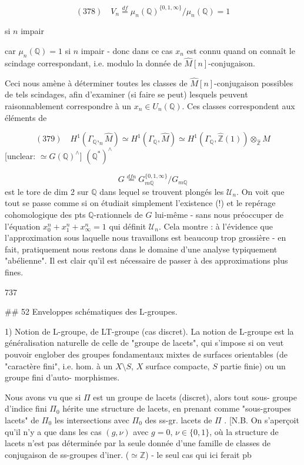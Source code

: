 $$ (378) \quad V_n \overset{df}{=} \mu_n(\mathbb{Q})^{\{0,1,\infty\}} / \mu_n(\mathbb{Q}) = 1 $$

si $n$ impair

car $\mu_n(\mathbb{Q}) = 1$ si $n$ impair - donc dans
ce cas $x_n$ est connu quand on connaît
le scindage correspondant, i.e. modulo la
donnée de $\hat{M}[n]$-conjugaison.

Ceci nous amène à déterminer toutes les
classes de $\hat{M}[n]$-conjugaison possibles de
tels scindages, afin d'examiner (si faire se
peut) lesquels peuvent raisonnablement
correspondre à un $x_n \in U_n(\mathbb{Q})$. Ces classes
correspondent aux éléments de

$$ (379) \quad H^1(\Gamma_{\mathbb{Q}}, _n\hat{M}) \simeq H^1(\Gamma_{\mathbb{Q}}, \hat{M}) \simeq H^1(\Gamma_{\mathbb{Q}}, \hat{\mathbb{Z}}(1)) \otimes_{\hat{\mathbb{Z}}} M $$
[unclear: $\simeq G(\mathbb{Q})^\wedge$] \qquad $(\mathbb{Q}^*)^{\wedge}$

\newpage


$$G \overset{dfn}{=} G_{m\mathbb{Q}}^{\{0,1,\infty\}} / G_{m\mathbb{Q}}$$
est le tore de dim 2 sur $\mathbb{Q}$ dans lequel
se trouvent plongés les $\mathcal{U}_n$. On voit que
tout se passe comme si on étudiait
simplement l'existence (!) et le repérage
cohomologique des pts $\mathbb{Q}$-rationnels de
$G$ lui-même - sans nous préoccuper
de l'équation $x_0^n + x_1^n + x_\infty^n = 1$ qui définit
$\mathcal{U}_n$. Cela montre : à l'évidence que
l'approximation sous laquelle nous travaillons
est beaucoup trop grossière - en fait,
pratiquement nous restons dans le
domaine d'une analyse typiquement
"abélienne". Il est clair qu'il est
nécessaire de passer à des approximations
plus fines.

\newpage


737

## 52 Enveloppes schématiques des L-groupes.

1) Notion de L-groupe, de LT-groupe (cas discret).
La notion de L-groupe est la généralisation
naturelle de celle de "groupe de lacets",
qui s'impose si on veut pouvoir englober
des groupes fondamentaux mixtes de
surfaces orientables (de "caractère fini", i.e.
hom. à un $X \setminus S$, $X$ surface compacte,
$S$ partie finie) ou un groupe fini d'auto-
morphismes.

Nous avons vu que si $\Pi$ est un
groupe de lacets (discret), alors tout sous-
groupe d'indice fini $\Pi_0$ hérite une
structure de lacets, en prenant comme
"sous-groupes lacets" de $\Pi_0$ les intersections
avec $\Pi_0$ des ss-gr. lacets de $\Pi$ . [N.B. On
s'aperçoit qu'il n'y a que dans les cas
$(g,\nu)$ avec $g=0$, $\nu \in \{0,1\}$, où la structure de lacets
n'est pas déterminée par la seule donnée d'une
famille de classes de conjugaison de ss-groupes
d'iner. ($\simeq \mathbb{Z}$) - le seul cas qui ici ferait pb

